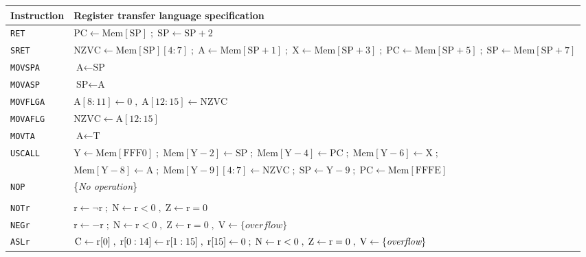 \documentclass[10pt,fleqn]{book}
\begin{document}
\begin{tabular}{ l l }
\toprule
Instruction & Register transfer language specification\\
\midrule

\verb|RET|     & $\textrm{PC}\leftarrow \textrm{Mem}[\textrm{SP}]\; ; \;\textrm{SP}\leftarrow\textrm{SP}+2$ \\
\verb|SRET|    & $\textrm{NZVC}\leftarrow\textrm{Mem}[\textrm{SP}][ 4:7] \; ; \; \textrm{A}\leftarrow\textrm{Mem}[\textrm{SP}+1] \; ; \; \textrm{X}\leftarrow\textrm{Mem}[\textrm{SP}+3] \; ; \; \textrm{PC}\leftarrow\textrm{Mem}[\textrm{SP}+5] \; ; \; \textrm{SP}\leftarrow\textrm{Mem}[\textrm{SP}+7]$\\
\verb|MOVSPA|  & $\textrm{A}\leftarrow \textrm{SP}$\\
\verb|MOVASP|  & $\textrm{SP}\leftarrow \textrm{A}$\\
\verb|MOVFLGA| & $\textrm{A}[ 8:11]\leftarrow 0 \; , \; \textrm{A}[ 12:15]\leftarrow \textrm{NZVC}$\\
\verb|MOVAFLG| & $\textrm{NZVC}\leftarrow \textrm{A}[ 12:15]$\\
\verb|MOVTA|   & $\textrm{A}\leftarrow \textrm{T}$\\
\verb|USCALL|  & $\textrm{Y}\leftarrow\textrm{Mem}[\textrm{FFF0}] \; ; \;
\textrm{Mem}[\textrm{Y}-2]\leftarrow\textrm{SP} \; ; \;
\textrm{Mem}[\textrm{Y}-4]\leftarrow\textrm{PC} \; ; \;
\textrm{Mem}[\textrm{Y}-6]\leftarrow\textrm{X} \; ; \;$\\
 & 
$\textrm{Mem}[\textrm{Y}-8]\leftarrow\textrm{A} \; ; \;
\textrm{Mem}[\textrm{Y}-9][ 4:7]\leftarrow\textrm{NZVC} \; ; \;
\textrm{SP}\leftarrow\textrm{Y}-9 \; ; \;
\textrm{PC}\leftarrow\textrm{Mem}[\textrm{FFFE}]$\\
\verb|NOP|     & \{\textit{No operation}\}\\
\\
\verb|NOTr|    & $\textrm{r}\leftarrow \neg\textrm{r}\; ; \;\textrm{N}\leftarrow\textrm{r}<0 \; , \; \textrm{Z}\leftarrow\textrm{r}=0$\\
\verb|NEGr|    & $\textrm{r}\leftarrow -\textrm{r}\; ; \;\textrm{N}\leftarrow\textrm{r}<0 \; , \; \textrm{Z}\leftarrow\textrm{r}=0 \; , \; \textrm{V}\leftarrow \{\textit{overflow}\}$\\
\verb|ASLr|    & $\textrm{C}\leftarrow \textrm{r}[ 0] \; , \; \textrm{r}[ 0:14]\leftarrow\textrm{r}[ 1:15] \; , \;\textrm{r}[ 15]\leftarrow\textrm0 \; ; \; \textrm{N}\leftarrow\textrm{r}<0 \; , \; \textrm{Z}\leftarrow\textrm{r}=0 \; , \; \textrm{V}\leftarrow \{\textit{overflow}\}$\\

\end{tabular}
\end{document}
